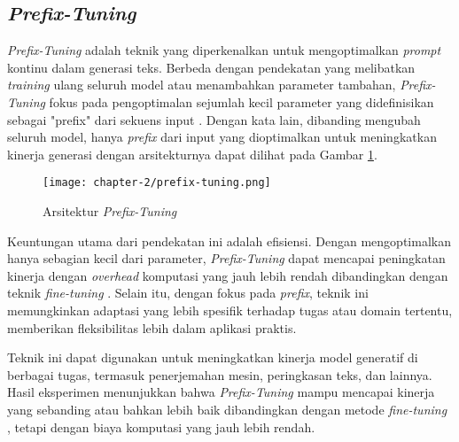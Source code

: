 \subsection{\textit{Prefix-Tuning}}

\textit{Prefix-Tuning} adalah teknik yang diperkenalkan untuk mengoptimalkan \textit{prompt} kontinu dalam generasi teks. Berbeda dengan pendekatan  yang melibatkan \textit{training} ulang seluruh model atau menambahkan parameter tambahan, \textit{Prefix-Tuning} fokus pada pengoptimalan sejumlah kecil parameter yang didefinisikan sebagai "prefix" dari sekuens input \parencite{prefix_tuning}. Dengan kata lain, dibanding mengubah seluruh model, hanya \textit{prefix} dari input yang dioptimalkan untuk meningkatkan kinerja generasi dengan arsitekturnya dapat dilihat pada Gambar \ref{fig:prefix-tuning}.

\begin{figure}[ht]
    \centering
    \texttt{[image: chapter-2/prefix-tuning.png]}
    \caption{Arsitektur \textit{Prefix-Tuning} \parencite{prefix_tuning}}
    \label{fig:prefix-tuning}
\end{figure}

Keuntungan utama dari pendekatan ini adalah efisiensi. Dengan mengoptimalkan hanya sebagian kecil dari parameter, \textit{Prefix-Tuning} dapat mencapai peningkatan kinerja dengan \textit{overhead} komputasi yang jauh lebih rendah dibandingkan dengan teknik \textit{fine-tuning} . Selain itu, dengan fokus pada \textit{prefix}, teknik ini memungkinkan adaptasi yang lebih spesifik terhadap tugas atau domain tertentu, memberikan fleksibilitas lebih dalam aplikasi praktis.

Teknik ini dapat digunakan untuk meningkatkan kinerja model generatif di berbagai tugas, termasuk penerjemahan mesin, peringkasan teks, dan lainnya. Hasil eksperimen menunjukkan bahwa \textit{Prefix-Tuning} mampu mencapai kinerja yang sebanding atau bahkan lebih baik dibandingkan dengan metode \textit{fine-tuning} , tetapi dengan biaya komputasi yang jauh lebih rendah.

